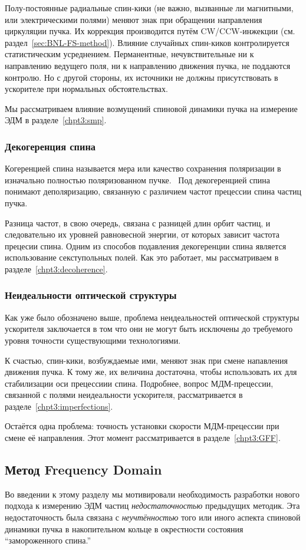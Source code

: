 Полу-постоянные радиальные спин-кики (не важно, вызванные ли магнитными, или электрическими полями) 
меняют знак при обращении направления циркуляции пучка. Их коррекция производится путём
CW/CCW-инжекции (см. раздел~\ref{sec:BNL-FS-method}). Влияние случайных спин-киков контролируется
статистическим усреднением. Перманентные, нечувствительные ни к направлению ведущего поля, ни к направлению
движения пучка, не поддаются контролю. Но с другой стороны, их источники не должны присутствовать в ускорителе
при нормальных обстоятельствах. 

Мы рассматриваем влияние возмущений спиновой динамики пучка на измерение
ЭДМ в разделе~\ref{chpt3:smp}.

\subsubsection{Декогеренция спина}
Когеренцией спина называется мера или качество сохранения поляризации
в изначально полностью поляризованном пучке.~\cite[стр.~205]{Eremey:Thesis}
Под декогеренцией спина понимают деполяризацию, связанную с различием частот прецессии спина
частиц пучка. 

Разница частот, в свою очередь, связана с разницей длин орбит частиц, и следовательно
их уровней равновесной энергии, от которых зависит частота прецесии спина. 
Одним из способов подавления декогеренции спина является использование секступольных полей. 
Как это работает, мы рассматриваем в разделе~\ref{chpt3:decoherence}.

\subsubsection{Неидеальности оптической структуры}
Как уже было обозначено выше, проблема неидеальностей оптической структуры ускорителя 
заключается в том что они не могут быть исключены до требуемого уровня точности 
существующими технологиями.

К счастью, спин-кики, возбуждаемые ими, меняют знак при смене напавления движения пучка. К тому же,
их величина достаточна, чтобы использовать их для стабилизации оси прецессиии спина.
Подробнее, вопрос МДМ-прецессии, связанной с полями неидеальности ускорителя, рассматривается в
 разделе~\ref{chpt3:imperfections}.

Остаётся одна проблема: точность установки скорости МДМ-прецессии при смене её направления. 
Этот момент рассматривается в разделе~\ref{chpt3:GFF}.

\subsection{Метод Frequency Domain}\label{sec:FDM_concept}
Во введении к этому разделу мы мотивировали необходимость разработки нового подхода к измерению
ЭДМ частиц \emph{недостаточностью} предыдущих методик. Эта недостаточность была связана с 
\emph{неучтённостью} того или иного аспекта спиновой динамики пучка в накопительном кольце 
в окрестности состояния ``замороженного спина.''

